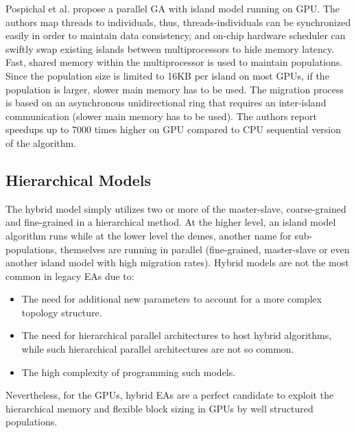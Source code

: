 \documentclass[prodmode,acmtecs]{acmsmall}
\begin{document}
Pospichal et al. \cite{pospichalParallelGeneticAlgorithOnCUDA2010,9253} propose a parallel GA with island model running on GPU. The authors map threads to individuals, thus, threads-individuals can be synchronized easily in order to maintain data consistency, and on-chip hardware scheduler can swiftly swap existing islands between multiprocessors to hide memory latency. Fast, shared memory within the multiprocessor is used to maintain populations.
Since the population size is limited to 16KB per island on most GPUs, if the population is larger, slower main memory has to be used. The migration process is based on an asynchronous unidirectional ring that requires an inter-island communication (slower main memory has to be used). The authors report speedups up to 7000 times higher on GPU compared to CPU sequential version of the algorithm.

\subsection{Hierarchical Models}

The hybrid model simply utilizes two or more of the master-slave, coarse-grained and fine-grained in a hierarchical method. At the higher level, an island model algorithm runs while at the lower level the demes, another name for sub-populations, themselves are running in parallel (fine-grained, master-slave or even another island model with high migration rates). Hybrid models are not the most common in legacy EAs due to:
\begin{itemize}
 \item The need for additional new parameters to account for a more complex topology structure. 
 \item The need for hierarchical parallel architectures to host hybrid algorithms, while such hierarchical parallel architectures are not so common. 
\item The high complexity of programming such models. 
\end{itemize}

Nevertheless, for the GPUs, hybrid EAs are a perfect candidate to exploit the hierarchical memory and flexible block sizing in GPUs by well structured populations. 
\end{document}
